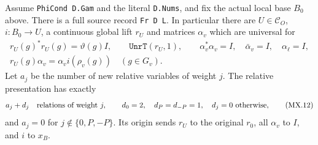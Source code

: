 \begin{proposition}
\label{claim:MX3}
Assume \texttt{PhiCond D.Gam} and the literal \texttt{D.Nums},
and fix the actual local base $B_0$ above.
There is a full source record \texttt{Fr D L}.
In particular there are $U\in\mathcal C_O$, $i:B_0\to U$,
a continuous global lift $r_U$ and matrices $\alpha_v$
which are universal for
\[
 \begin{gathered}
 r_U(g)^*r_U(g)=\vartheta(g)I,\qquad
 \texttt{UnrT}(r_U,1),\qquad
 \alpha_v^*\alpha_v=I,\quad \bar\alpha_v=I,
 \quad\alpha_\ell=I,\\
 r_U(g)\alpha_v=\alpha_v i(\rho_v(g))
                                      \quad(g\in G_v).
 \end{gathered}
 \tag{MX.11}
\]
Let $a_j$ be the number of new relative variables of weight
$j$.  The relative presentation has exactly
\[
 a_j+d_j\quad\hbox{relations of weight }j,
 \qquad
 d_0=2,\quad d_P=d_{-P}=1,\quad d_j=0\text{ otherwise},
 \tag{MX.12}
\]
and $a_j=0$ for $j\notin\{0,P,-P\}$.
Its origin sends $r_U$ to the original $r_0$, all
$\alpha_v$ to $I$, and $i$ to $x_B$.
\end{proposition}
